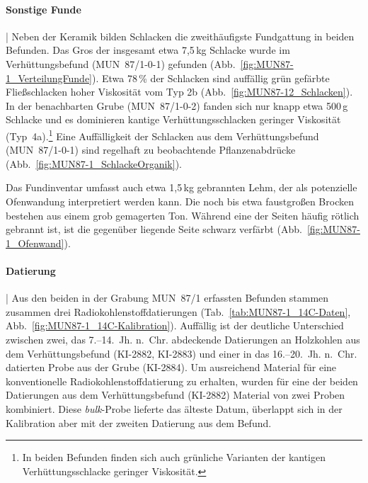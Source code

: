 \paragraph{Sonstige Funde}\hspace{-.5em}|\hspace{.5em}%
Neben der Keramik bilden Schlacken die zweithäufigste Fundgattung in beiden Befunden. Das Gros der insgesamt etwa 7,5\,kg Schlacke wurde im Verhüttungsbefund (MUN~87/1-0-1) gefunden (Abb.~\ref{fig:MUN87-1_VerteilungFunde}). Etwa 78\,\% der Schlacken sind auffällig grün gefärbte Fließschlacken hoher Viskosität vom Typ 2b (Abb.~\ref{fig:MUN87-12_Schlacken}). In der benachbarten Grube (MUN~87/1-0-2) fanden sich nur knapp etwa 500\,g Schlacke und es dominieren kantige Verhüttungsschlacken geringer Viskosität (Typ~4a).\footnote{In beiden Befunden finden sich auch grünliche Varianten der kantigen Verhüttungsschlacke geringer Viskosität.} Eine Auffälligkeit der Schlacken aus dem Verhüttungsbefund (MUN~87/1-0-1) sind regelhaft zu beobachtende Pflanzenabdrücke (Abb.~\ref{fig:MUN87-1_SchlackeOrganik}).

Das Fundinventar umfasst auch etwa 1,5\,kg gebrannten Lehm, der als potenzielle Ofenwandung interpretiert werden kann. Die noch bis etwa faustgroßen Brocken bestehen aus einem grob gemagerten Ton. Während eine der Seiten häufig rötlich gebrannt ist, ist die gegenüber liegende Seite schwarz verfärbt (Abb.~\ref{fig:MUN87-1_Ofenwand}).

\paragraph{Datierung}\hspace{-.5em}|\hspace{.5em}%
Aus den beiden in der Grabung MUN~87/1 erfassten Befunden stammen zusammen drei Radiokohlenstoffdatierungen (Tab.~\ref{tab:MUN87-1_14C-Daten}, Abb.~\ref{fig:MUN87-1_14C-Kalibration}). Auffällig ist der deutliche Unterschied zwischen zwei, das 7.--14.~Jh. n.~Chr. abdeckende Datierungen an Holzkohlen aus dem Verhüttungsbefund (KI-2882, KI-2883) und einer in das 16.--20.~Jh. n.~Chr. datierten Probe aus der Grube (KI-2884). Um ausreichend Material für eine konventionelle Radiokohlenstoffdatierung zu erhalten, wurden für eine der beiden Datierungen aus dem Verhüttungsbefund (KI-2882) Material von zwei Proben kombiniert. Diese \textit{bulk}-Probe lieferte das älteste Datum, überlappt sich in der Kalibration aber mit der zweiten Datierung aus dem Befund. 

